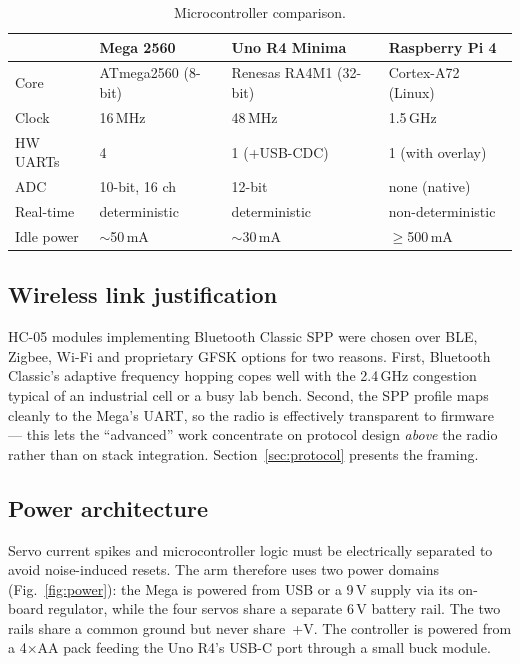 \begin{table}[t]
  \centering
  \caption{Microcontroller comparison.}
  \label{tab:mcucompare}
  \footnotesize
  \begin{tabularx}{\columnwidth}{lXXX}
    \toprule
    & \textbf{Mega 2560} & \textbf{Uno R4 Minima} & \textbf{Raspberry Pi 4} \\
    \midrule
    Core      & ATmega2560 (8-bit) & Renesas RA4M1 (32-bit) & Cortex-A72 (Linux) \\
    Clock     & 16\,MHz            & 48\,MHz                 & 1.5\,GHz \\
    HW UARTs  & 4                  & 1 (+USB-CDC)            & 1 (with overlay) \\
    ADC       & 10-bit, 16 ch      & 12-bit                  & none (native) \\
    Real-time & deterministic      & deterministic           & non-deterministic \\
    Idle power& $\sim$50\,mA       & $\sim$30\,mA            & $\geq$500\,mA \\
    \bottomrule
  \end{tabularx}
\end{table}

\subsection{Wireless link justification}
HC-05 modules implementing Bluetooth Classic SPP were chosen over BLE,
Zigbee, Wi-Fi and proprietary GFSK options for two reasons. First,
Bluetooth Classic's adaptive frequency hopping copes well with the
2.4\,GHz congestion typical of an industrial cell or a busy lab
bench. Second, the SPP profile maps cleanly to the Mega's UART, so
the radio is effectively transparent to firmware --- this lets the
``advanced'' work concentrate on protocol design \emph{above} the
radio rather than on stack integration. Section~\ref{sec:protocol}
presents the framing.

\subsection{Power architecture}
Servo current spikes and microcontroller logic must be electrically
separated to avoid noise-induced resets. The arm therefore uses two
power domains (Fig.~\ref{fig:power}): the Mega is powered from USB
or a 9\,V supply via its on-board regulator, while the four servos
share a separate 6\,V battery rail. The two rails share a common
ground but never share~+V. The controller is powered from a 4$\times$AA
pack feeding the Uno R4's USB-C port through a small buck module.


